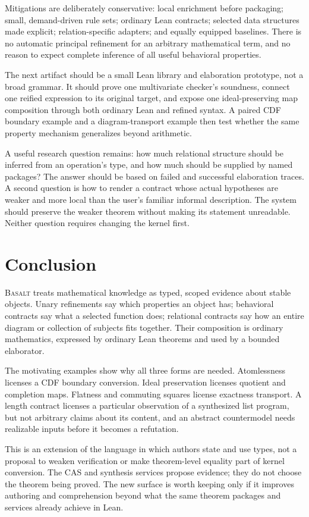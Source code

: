 \documentclass[11pt,a4paper]{article}
\newcommand{\Basalt}{\textsc{Basalt}}
\theoremstyle{plain}
\theoremstyle{definition}
\theoremstyle{remark}
\begin{document}
Mitigations are deliberately conservative: local enrichment before packaging;
small, demand-driven rule sets; ordinary Lean contracts; selected data structures
made explicit; relation-specific adapters; and equally equipped baselines.
There is no automatic principal refinement for an arbitrary mathematical term,
and no reason to expect complete inference of all useful behavioral properties.

The next artifact should be a small Lean library and elaboration prototype,
not a broad grammar. It should prove one multivariate checker's soundness,
connect one reified expression to its original target, and expose one
ideal-preserving map composition through both ordinary Lean and refined
syntax. A paired CDF boundary example and a diagram-transport example then
test whether the same property mechanism generalizes beyond arithmetic.

A useful research question remains: how much relational structure should be
inferred from an operation's type, and how much should be supplied by named
packages? The answer should be based on failed and successful elaboration
traces. A second question is how to render a contract whose actual hypotheses
are weaker and more local than the user's familiar informal description.
The system should preserve the weaker theorem without making its statement
unreadable. Neither question requires changing the kernel first.

\section{Conclusion}
\Basalt{} treats mathematical knowledge as typed, scoped evidence about stable
objects. Unary refinements say which properties an object has; behavioral
contracts say what a selected function does; relational contracts say how an
entire diagram or collection of subjects fits together. Their composition is
ordinary mathematics, expressed by ordinary Lean theorems and used by a bounded
elaborator.

The motivating examples show why all three forms are needed. Atomlessness
licenses a CDF boundary conversion. Ideal preservation licenses quotient and
completion maps. Flatness and commuting squares license exactness transport.
A length contract licenses a particular observation of a synthesized list
program, but not arbitrary claims about its content, and an abstract
countermodel needs realizable inputs before it becomes a refutation.

This is an extension of the language in which authors state and use types,
not a proposal to weaken verification or make theorem-level equality part of
kernel conversion. The CAS and synthesis services propose evidence; they do
not choose the theorem being proved. The new surface is worth keeping only
if it improves authoring and comprehension beyond what the same theorem
packages and services already achieve in Lean.
\end{document}
